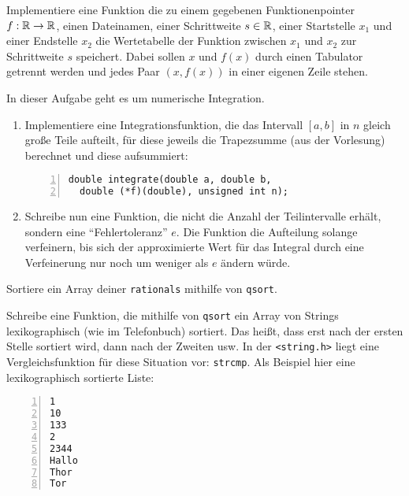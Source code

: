 \documentclass{uebungszettel}
\begin{document}
\begin{aufg} Implementiere eine Funktion die zu einem gegebenen Funktionenpointer $f:\mathbb{R} \rightarrow \mathbb{R}$, einen Dateinamen, einer Schrittweite $s \in \mathbb{R}$, einer Startstelle $x_1$ und einer Endstelle $x_2$ die Wertetabelle der Funktion zwischen $x_1$ und $x_2$ zur Schrittweite $s$ speichert. Dabei sollen $x$ und $f(x)$ durch einen Tabulator getrennt werden und jedes Paar $(x, f(x))$ in einer eigenen Zeile stehen.
\end{aufg}

\begin{aufg}
In dieser Aufgabe geht es um numerische Integration.
\begin{enumerate}
\item Implementiere eine Integrationsfunktion, die das Intervall $[a, b]$ in $n$ gleich große Teile aufteilt, für diese jeweils die Trapezsumme (aus der Vorlesung) berechnet und diese aufsummiert:

\begin{codelisting}
\begin{lstlisting}[numbers=left,numberstyle=\tiny,frame=tlrb]
double integrate(double a, double b, 
  double (*f)(double), unsigned int n); 
\end{lstlisting}
\end{codelisting}

\item Schreibe nun eine Funktion, die nicht die Anzahl der Teilintervalle erhält, sondern eine ``Fehlertoleranz'' $e$. Die Funktion die Aufteilung solange verfeinern, bis sich der approximierte Wert für das Integral durch eine Verfeinerung nur noch um weniger als $e$ ändern würde. 
\end{enumerate}
\end{aufg}

\begin{aufg} 
Sortiere ein Array deiner \verb|rationals| mithilfe von \verb|qsort|.
\end{aufg}

\begin{aufg} Schreibe eine Funktion, die mithilfe von \verb|qsort| ein Array von Strings lexikographisch (wie im 
Telefonbuch) sortiert. Das heißt, dass erst nach der ersten Stelle sortiert wird, dann nach der Zweiten usw. In der 
\verb|<string.h>| liegt eine Vergleichsfunktion für diese Situation vor: \verb|strcmp|. Als Beispiel hier eine 
lexikographisch sortierte Liste:
\begin{codelisting}
\begin{lstlisting}[numbers=left,numberstyle=\tiny,frame=tlrb]
1
10
133
2
2344
Hallo
Thor
Tor
\end{lstlisting}
\end{codelisting}
\end{aufg}
\end{document}
